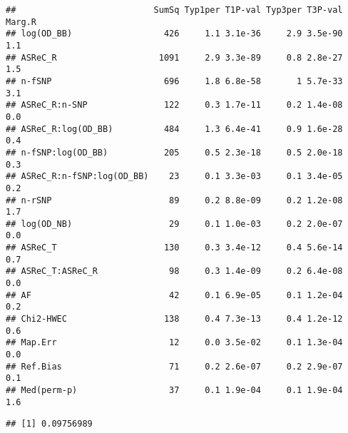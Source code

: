 \documentclass[]{article}
\newenvironment{Shaded}{\begin{snugshade}}{\end{snugshade}}
\newcommand{\KeywordTok}[1]{\textcolor[rgb]{0.13,0.29,0.53}{\textbf{#1}}}
\newcommand{\DataTypeTok}[1]{\textcolor[rgb]{0.13,0.29,0.53}{#1}}
\newcommand{\StringTok}[1]{\textcolor[rgb]{0.31,0.60,0.02}{#1}}
\newcommand{\OperatorTok}[1]{\textcolor[rgb]{0.81,0.36,0.00}{\textbf{#1}}}
\newcommand{\NormalTok}[1]{#1}
\begin{document}
\begin{Shaded}
\end{Shaded}

\begin{verbatim}
##                           SumSq Typ1per T1P-val Typ3per T3P-val Marg.R
## log(OD_BB)                  426     1.1 3.1e-36     2.9 3.5e-90    1.1
## ASReC_R                    1091     2.9 3.3e-89     0.8 2.8e-27    1.5
## n-fSNP                      696     1.8 6.8e-58       1 5.7e-33    3.1
## ASReC_R:n-SNP               122     0.3 1.7e-11     0.2 1.4e-08    0.0
## ASReC_R:log(OD_BB)          484     1.3 6.4e-41     0.9 1.6e-28    0.4
## n-fSNP:log(OD_BB)           205     0.5 2.3e-18     0.5 2.0e-18    0.3
## ASReC_R:n-fSNP:log(OD_BB)    23     0.1 3.3e-03     0.1 3.4e-05    0.2
## n-rSNP                       89     0.2 8.8e-09     0.2 1.2e-08    1.7
## log(OD_NB)                   29     0.1 1.0e-03     0.2 2.0e-07    0.0
## ASReC_T                     130     0.3 3.4e-12     0.4 5.6e-14    0.7
## ASReC_T:ASReC_R              98     0.3 1.4e-09     0.2 6.4e-08    0.0
## AF                           42     0.1 6.9e-05     0.1 1.2e-04    0.2
## Chi2-HWEC                   138     0.4 7.3e-13     0.4 1.2e-12    0.6
## Map.Err                      12     0.0 3.5e-02     0.1 1.3e-04    0.0
## Ref.Bias                     71     0.2 2.6e-07     0.2 2.9e-07    0.1
## Med(perm-p)                  37     0.1 1.9e-04     0.1 1.9e-04    1.6
\end{verbatim}

\begin{Shaded}
\end{Shaded}

\begin{verbatim}
## [1] 0.09756989
\end{verbatim}

\begin{Shaded}
\end{Shaded}
\end{document}
